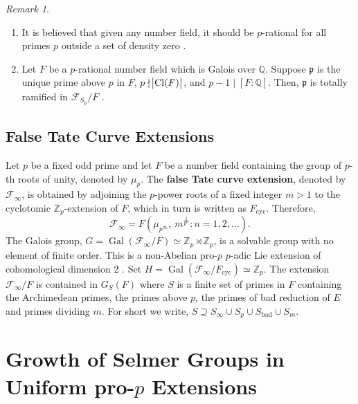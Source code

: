 \documentclass{amsart}
\DeclareMathOperator{\Gal}{Gal}
\DeclareMathOperator{\cyc}{cyc}
\DeclareMathOperator{\Cl}{Cl}
\DeclareMathOperator{\bad}{bad}
\newcommand{\QQ}{\mathbb Q}
\newcommand{\F}{\mathcal F}
\newcommand{\ZZ}{\mathbb Z}
\newcommand{\fp}{\mathfrak p}
\theoremstyle{definition}
\theoremstyle{remark}
\newtheorem{rem}[Th]{Remark}
\begin{document}
\begin{rem}
\label{greenberg's remark}
\begin{enumerate}
\item It is believed that given any number field, it should be $p$-rational for all primes $p$ outside a set of density zero \cite[Page 99]{Gre16}.
\item Let $F$ be a $p$-rational number field which is Galois over $\QQ$.
Suppose $\fp$ is the unique prime above $p$ in $F$, $p\nmid \abs{ \Cl(F)}$, and $p-1 \mid [F:\QQ]$.
Then, $\fp$ is totally ramified in $\F_{S_p}/F$ \cite[Remark 6.4]{Gre16}. 
\end{enumerate}
\end{rem}

\subsection{False Tate Curve Extensions}
\label{false Tate curve preliminary} Let $p$ be a fixed odd prime and let $F$ be a number field containing the group of $p$-th roots of unity, denoted by $\mu_p$.
The \textbf{false Tate curve extension}, denoted by $\F_\infty$, is obtained by adjoining the $p$-power roots of a fixed integer $m>1$ to the cyclotomic $\ZZ_p$-extension of $F$, which in turn is written as $F_{\cyc}$. 
Therefore,
\[
\F_\infty = F\left( \mu_{p^\infty}, \ m^{\frac{1}{p^n}} : n = 1, 2, \ldots \right).
\]  
The Galois group, $G=\Gal\left( \F_\infty / F\right) \simeq \ZZ_p \rtimes \ZZ_p$, is a solvable group with no element of finite order. 
This is a non-Abelian pro-$p$ $p$-adic Lie extension of cohomological dimension 2 \cite{Ser65}.
Set $H= \Gal\left( \F_\infty / F_{\cyc}\right) \simeq \ZZ_p$.
The extension $\F_\infty/F$ is contained in $G_S(F)$ where $S$ is a finite set of primes in $F$ containing the Archimedean primes, the primes above $p$, the primes of bad reduction of $E$ and primes dividing $m$.
For short we write, $S\supseteq S_\infty \cup S_p \cup S_{\bad} \cup S_m$.

\section{Growth of Selmer Groups in Uniform pro-$p$ Extensions} \label{Analogue of HM19}
\end{document}
